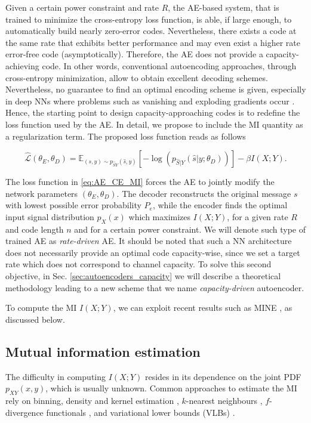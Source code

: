 Given a certain power constraint and rate $R$, the AE-based system, that is trained to minimize the cross-entropy loss function, is able, if large enough, to automatically build nearly zero-error codes. Nevertheless, there exists a code at the same rate that exhibits better performance and may even exist a higher rate error-free code (asymptotically). Therefore, the AE does not provide a capacity-achieving code. In other words, conventional autoencoding approaches, through cross-entropy minimization, allow to obtain excellent decoding schemes. Nevertheless, no guarantee to find an optimal encoding scheme is given, especially in deep NNs where problems such as vanishing and exploding gradients occur \cite{279181}. 
Hence, the starting point to design capacity-approaching codes is to redefine the loss function used by the AE.
In detail, we propose to include the MI quantity as a regularization term. The proposed loss function reads as follows

\begin{equation}
\label{eq:AE_CE_MI}
\hat{\mathcal{L}}(\theta_E, \theta_D) = \mathbb{E}_{(s,y)\sim p_{\hat{S}Y}(\hat{s},y)}[-\log(p_{\hat{S}|Y}(\hat{s}|y;\theta_D))]-\beta I(X;Y).
\end{equation}

The loss function in \eqref{eq:AE_CE_MI} forces the AE to jointly modify the network parameters $(\theta_E,\theta_D)$. The decoder reconstructs the original message $s$ with lowest possible error probability $P_e$, while the encoder finds the optimal input signal distribution $p_X(x)$ which maximizes $I(X;Y)$, for a given rate $R$ and code length $n$ and for a certain power constraint. We will denote such type of trained AE as \textit{rate-driven} AE.
It should be noted that such a NN architecture does not necessarily provide an optimal code capacity-wise, since we set a target rate which does not correspond to channel capacity. To solve this second objective, in Sec. \ref{sec:autoencoders_capacity} we will describe a theoretical methodology leading to a new scheme that we name \textit{capacity-driven} autoencoder.

To compute the MI $I(X;Y)$, we can exploit recent results such as MINE \cite{Mine2018}, as discussed below.

\subsection{Mutual information estimation}
\label{subsec:autoencoders_mutual_information_estimation}
The difficulty in computing $I(X;Y)$ resides in its dependence on the joint PDF $p_{XY}(x,y)$, which is usually unknown. Common approaches to estimate the MI rely on binning, density and kernel estimation \cite{Moon1995}, $k$-nearest neighbours \cite{Kraskov2004}, $f$-divergence functionals \cite{Nguyen2010}, and variational lower bounds (VLBs) \cite{Poole2019}. 

